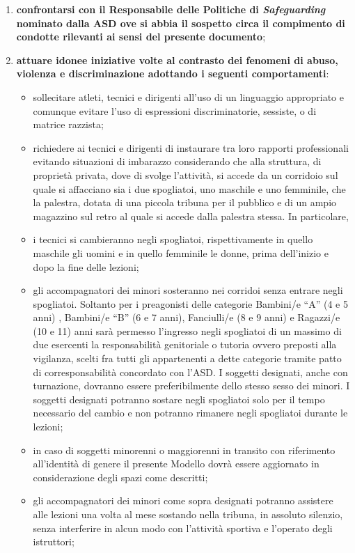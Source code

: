 \documentclass{djtsdoc}
\begin{document}
\begin{enumerate}
\begin{enumerate}
			\item \textbf{confrontarsi con il Responsabile delle Politiche di \textit{Safeguarding} nominato dalla ASD ove si abbia il sospetto circa il compimento di condotte rilevanti ai sensi del presente documento};
			\item \textbf{attuare idonee iniziative volte al contrasto dei fenomeni di abuso, violenza e discriminazione adottando i seguenti comportamenti}:
			\begin{itemize}
				\item sollecitare atleti, tecnici e dirigenti all'uso di un linguaggio appropriato e comunque evitare l'uso di espressioni discriminatorie, sessiste, o di matrice razzista;
				\item richiedere ai tecnici e dirigenti di instaurare tra loro rapporti professionali evitando situazioni di imbarazzo considerando che alla struttura, di proprietà privata, dove di svolge l'attività, si accede da un corridoio sul quale si affacciano sia i due spogliatoi, uno maschile e uno femminile, che la palestra, dotata di una piccola tribuna per il pubblico e di un ampio magazzino sul retro al quale si accede dalla palestra stessa. In particolare, 
				\item i tecnici si cambieranno negli spogliatoi, rispettivamente in quello maschile gli uomini e in quello femminile le donne, prima dell'inizio e dopo la fine delle lezioni;
				\item gli accompagnatori dei minori sosteranno nei corridoi senza entrare negli spogliatoi. Soltanto per i preagonisti delle categorie Bambini/e “A” (4 e 5 anni) , Bambini/e “B” (6 e 7 anni), Fanciulli/e (8 e 9 anni) e Ragazzi/e (10 e 11) anni sarà permesso l'ingresso negli spogliatoi di un massimo di due esercenti la responsabilità genitoriale o tutoria ovvero preposti alla vigilanza, scelti fra tutti gli appartenenti a dette categorie tramite patto di corresponsabilità concordato con l'ASD. I soggetti designati, anche con turnazione, dovranno essere preferibilmente dello stesso sesso dei minori. I soggetti designati potranno sostare negli spogliatoi solo per il tempo necessario del cambio e non potranno rimanere negli spogliatoi durante le lezioni;
				\item in caso di soggetti minorenni o maggiorenni in transito con riferimento all'identità di genere il presente Modello dovrà essere aggiornato in considerazione degli spazi come descritti;
				\item gli accompagnatori dei minori come sopra designati potranno assistere alle lezioni una volta al mese sostando nella tribuna, in assoluto silenzio, senza interferire in alcun modo con l'attività sportiva e l'operato degli istruttori;

\end{itemize}
\end{enumerate}
\end{enumerate}
\end{document}
